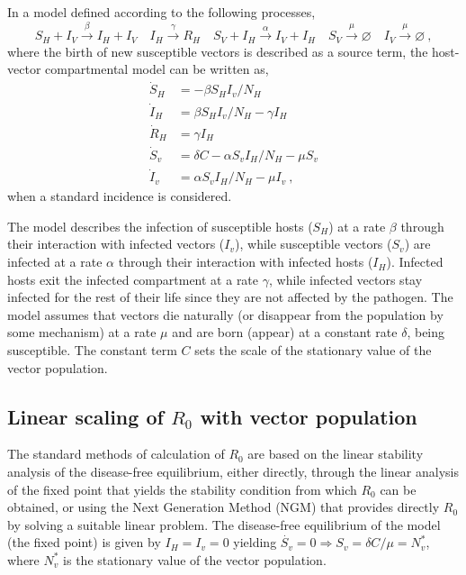 In a model defined according to the following processes,
\begin{equation}\label{eq:scheme_infection}
    S_H+I_V \stackrel{\beta}{\rightarrow} I_H + I_V \quad I_H
    \stackrel{\gamma}{\rightarrow} R_H \quad S_V+I_H
    \stackrel{\alpha}{\rightarrow}
    I_V+I_H \quad S_V \stackrel{\mu}{\rightarrow} \varnothing \quad I_V
    \stackrel{\mu}{\rightarrow} \varnothing
    \ ,
\end{equation}
where the birth of new susceptible vectors is described as a source term,
the host-vector compartmental model can be written as,
\begin{equation}\label{eq:SIR_v}
    \begin{aligned}
        \dot{S}_H & =-\beta S_H I_v / N_H                     \\
        \dot{I}_H & =\beta S_H I_v / N_H - \gamma I_H         \\
        \dot{R}_H & =\gamma I_H                               \\
        \dot{S}_v & = \delta C-\alpha S_v I_H / N_H - \mu S_v \\
        \dot{I}_v & =\alpha S_v I_H / N_H - \mu I_v \ ,
    \end{aligned}
\end{equation}
when a standard incidence \cite{MartchevaBook} is considered.

The model describes the infection of susceptible hosts ($S_H$) at a rate
$\beta$ through their interaction with infected vectors ($I_v$), while
susceptible vectors ($S_v$) are infected at a rate $\alpha$ through their
interaction with infected hosts ($I_H$). Infected hosts exit the infected
compartment at a rate $\gamma$, while infected vectors stay infected for the
rest of their life since they are not affected by the pathogen. The model
assumes that vectors die naturally (or disappear from the population by some
mechanism) at a rate $\mu$ and are born (appear) at a constant rate $\delta$,
being susceptible. The constant term $C$ sets the scale of the stationary value
of the vector population.

\subsection{Linear scaling of $R_0$ with vector population}

The standard methods of calculation of $R_0$ are based on the linear
stability analysis of the disease-free equilibrium, either directly, through
the linear analysis of the fixed point that yields the stability condition from
which $R_0$ can be obtained, or using the Next Generation Method (NGM)
\cite{Diekmann2010} that provides directly $R_0$ by solving a suitable linear
problem. The disease-free equilibrium of the model (the fixed point) is given
by $I_H=I_v=0$ yielding $\dot{S_v}=0\Longrightarrow S_v=\delta C/\mu=N_v^*$,
where $N_v^*$ is the stationary value of the vector population.\\

